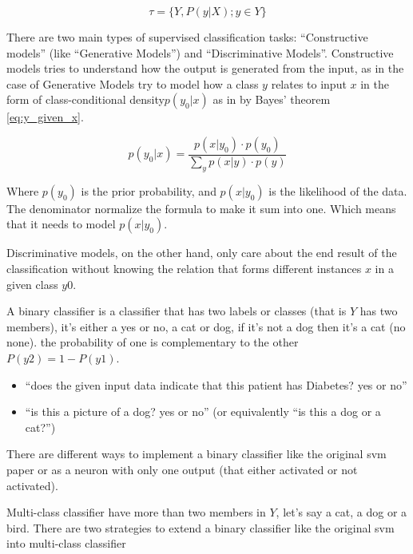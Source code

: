 \begin{equation}\label{eq_task}
\tau = \{ Y , P(y|X) ; y \in Y \}
\end{equation}

There are two main types of supervised classification tasks:
``Constructive models'' (like ``Generative Models'') and ``Discriminative Models''.
Constructive models tries to understand how the output is generated from the input,
as in the case of Generative Models\autocite{battiti2017lion} try to model how a class \(y\) relates to input \(x\)
in the form of class-conditional density\(p(y_{0}|x)\) as in by Bayes’ theorem \ref{eq:y_given_x}.

\begin{equation}
p(y_{0}|x) = \frac { p(x|y_{0}) \cdot p(y_{0}) } { \sum\limits_{y} p(x|y) \cdot p(y) }
\label{eq:y_given_x}
\end{equation}

Where \(p(y_0)\) is the prior probability, and \(p(x|y_0)\) is the likelihood of the data.
The denominator normalize the formula to make it sum into one.
Which means that it needs to model \(p(x|y_{0})\).

Discriminative models, on the other hand, only care about the end result of the classification
without knowing the relation that forms different instances \(x\) in a given class \(y0\).


A binary classifier is a classifier that has two labels or classes (that is \(Y\) has two members),
it's either a yes or no, a cat or dog, if it's not a dog then it's a cat (no none).
the probability of one is complementary to the other \( P(y2)=1-P(y1) \).

\begin{itemize}
\item ``does the given input data indicate that this patient has Diabetes? yes or no''
\item ``is this a picture of a dog? yes or no'' (or equivalently ``is this a dog or a cat?'')
\end{itemize}

There are different ways to implement a binary classifier 
like the original \gls{svm} paper\autocite{cortes1995support}
or as a neuron with only one output (that either activated or not activated).

Multi-class classifier have more than two members in \(Y\), let's say a cat, a dog or a bird.
There are two strategies to extend a binary classifier like the original \gls{svm}
into multi-class classifier\autocite{vapnik1995nature}\autocite{hsu2002comparison}\autocite{knerr1990single}

